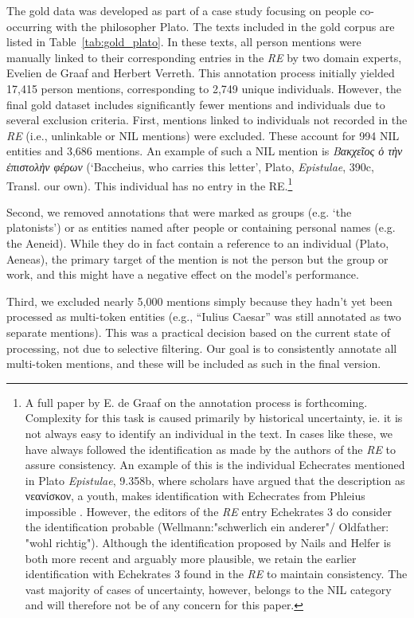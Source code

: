 \documentclass[final]{anthology-ch}
\begin{document}
The gold data was developed as part of a case study focusing on people co-occurring with the philosopher Plato. The texts included in the gold corpus are listed in Table~\ref{tab:gold_plato}. In these texts, all person mentions were manually linked to their corresponding entries in the \textit{RE} by two domain experts, Evelien de Graaf and Herbert Verreth. This annotation process initially yielded 17,415 person mentions, corresponding to 2,749 unique individuals. However, the final gold dataset includes significantly fewer mentions and individuals due to several exclusion criteria. First, mentions linked to individuals not recorded in the \textit{RE} (i.e., unlinkable or NIL mentions) were excluded. These account for 994 NIL entities and 3,686 mentions. An example of such a NIL mention is \emph{Βακχεῖος ὁ τὴν ἐπιστολὴν φέρων} (`Baccheius, who carries this letter', Plato, \textit{Epistulae}, 390c, Transl. our own). This individual has no entry in the RE.\footnote{A full paper by E. de Graaf on the annotation process is forthcoming. Complexity for this task is caused primarily by historical uncertainty, ie. it is not always easy to identify an individual in the text. In cases like these, we have always followed the identification as made by the authors of the \textit{RE} to assure consistency. An example of this is the individual Echecrates mentioned in Plato \textit{Epistulae}, 9.358b, where scholars have argued that the description as νεανίσκον, a youth, makes identification with Echecrates from Phleius impossible \cite{nailsPeoplePlatoProsopography2002, helferPlatoLettersPolitical2023}. However, the editors of the \textit{RE} entry Echekrates 3 do consider the identification probable (Wellmann:"schwerlich ein anderer"/ Oldfather: "wohl richtig"). Although the identification proposed by Nails and Helfer is both more recent and arguably more plausible, we retain the earlier identification with Echekrates 3 found in the \textit{RE} to maintain consistency. The vast majority of cases of uncertainty, however, belongs to the NIL category and will therefore not be of any concern for this paper.}

Second, we removed annotations that were marked as groups (e.g. `the platonists') or as entities named after people or containing personal names (e.g. the Aeneid). While they do in fact contain a reference to an individual (Plato, Aeneas), the primary target of the mention is not the person but the group or work, and this might have a negative effect on the model's performance.

Third, we excluded nearly 5,000 mentions simply because they hadn’t yet been processed as multi-token entities (e.g., “Iulius Caesar” was still annotated as two separate mentions). This was a practical decision based on the current state of processing, not due to selective filtering. Our goal is to consistently annotate all multi-token mentions, and these will be included as such in the final version.
\end{document}
